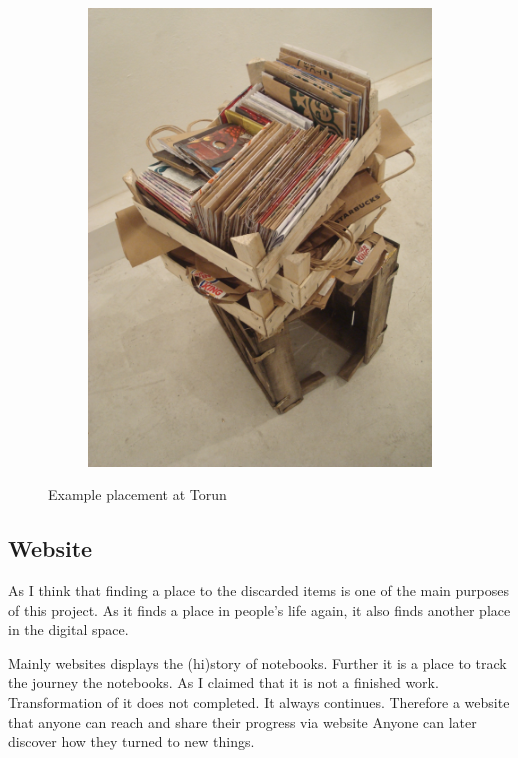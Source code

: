 \begin{figure}
\begin{subfigure}[b]{0.47\textwidth}
        \includegraphics[width=\textwidth]{project_graphics/torun3.jpg}
    \end{subfigure}
    \caption{Example placement at Torun}
    \label{fig:ExperimentWithPaper}
\end{figure}




%
%
\subsection{Website}
As I think that finding a place to the discarded items is one of the main purposes of this project. As it finds a place in people's life again, it also finds another place in the digital space.

Mainly websites displays the (hi)story of notebooks. Further it is a place to track the journey the notebooks. As I claimed that it is not a finished work. Transformation of it does not completed. It always continues. Therefore a website that anyone can reach and share their progress via website  Anyone can later discover how they turned to new things.

